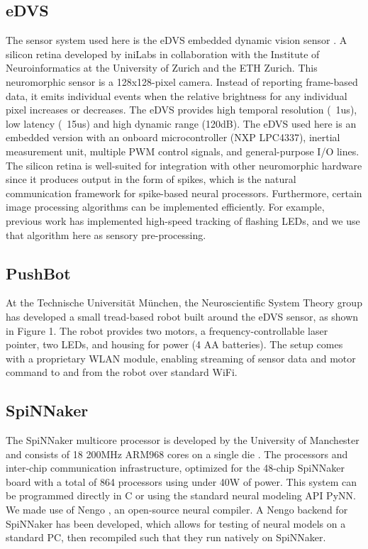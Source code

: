 \documentclass[conference]{IEEEtran}
\begin{document}
\subsection{eDVS}
The sensor system used here is the eDVS embedded dynamic vision sensor \cite{conradt2009embedded}.  A silicon retina developed by iniLabs in collaboration with the Institute of Neuroinformatics at the University of Zurich and the ETH Zurich. This neuromorphic sensor is a 128x128-pixel camera. Instead of reporting frame-based data, it emits individual events when the relative brightness for any individual pixel increases or decreases. The eDVS provides high temporal resolution (~1us), low latency (~15us) and high dynamic range (120dB). The eDVS used here is an embedded version with an onboard microcontroller (NXP LPC4337), inertial measurement unit, multiple PWM control signals, and general-purpose I/O lines. The silicon retina is well-suited for integration with other neuromorphic hardware since it produces output in the form of spikes, which is the natural communication framework for spike-based neural processors. Furthermore, certain image processing algorithms can be implemented efficiently. For example, previous work \cite{muller2011miniature} has implemented high-speed tracking of flashing LEDs, and we use that algorithm here as sensory pre-processing.


\subsection{PushBot}
At the Technische Universit{\"a}t M{\"u}nchen, the Neuroscientific
System Theory group has developed a small tread-based robot built around the eDVS sensor, as shown in Figure 1. The robot provides two motors, a frequency-controllable laser pointer, two LEDs, and housing for power (4 AA batteries). The setup comes with a proprietary WLAN module, enabling streaming of sensor data and motor command to and from the robot over standard WiFi.

\subsection{SpiNNaker}

The SpiNNaker multicore processor is developed by the University of Manchester and consists of 18 200MHz ARM968 cores on a single die \cite{furber2007neural, furber2014spinnaker}. The processors and inter-chip communication infrastructure, optimized for the 48-chip SpiNNaker board with a total of 864 processors using under 40W of power. This system can be programmed directly in C or using the standard neural modeling API PyNN. We made use of Nengo \cite{bekolay_nengo2014}, an open-source neural compiler. A Nengo backend for SpiNNaker has been developed, which allows for testing of neural models on a standard PC, then recompiled such that they run natively on SpiNNaker.
\end{document}
